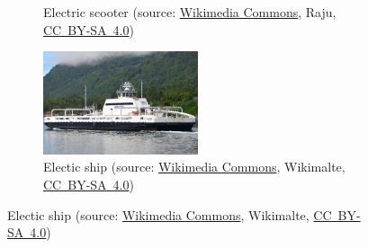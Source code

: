 \begin{frame}[c]
\begin{figure}
\begin{subfigure}[b]{0.49\textwidth}
			\caption{Electric scooter (source: \href{https://commons.wikimedia.org/wiki/File:Bolt_Electric_Scooter_\%28Warsaw\%29_in_2020.03.jpg}{Wikimedia Commons}, Raju, \href{https://creativecommons.org/licenses/by-sa/4.0/deed.en}{CC~BY-SA~4.0})}
		\end{subfigure}
		\pause
		\hfill
		\begin{subfigure}[b]{0.49\textwidth}
			\centering
			\includegraphics[width=0.5\textwidth]{fig/lec01/Electric_ship.jpg}
			\caption{Electic ship (source: \href{https://commons.wikimedia.org/wiki/File:Ferry_Ampere_Sognefjord.jpg}{Wikimedia Commons},  	 	Wikimalte, \href{https://creativecommons.org/licenses/by-sa/4.0/deed.en}{CC~BY-SA~4.0})}
		\end{subfigure}
	\end{figure}
\end{frame}

